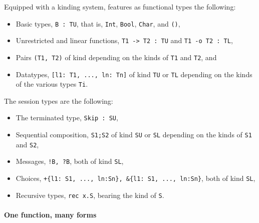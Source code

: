 Equipped with a kinding system, \freest{} features as functional types
the following:
%
\begin{itemize}
\item Basic types, \lstinline|B : TU|, that is, \lstinline|Int|,
  \lstinline|Bool|, \lstinline|Char|, and \lstinline|()|,
\item Unrestricted and linear functions, \lstinline|T1 -> T2 : TU| and
  \lstinline|T1 -o T2 : TL|,
\item Pairs \lstinline|(T1, T2)| of kind
  depending on the kinds of
  \lstinline|T1| and \lstinline|T2|, and
\item Datatypes, \lstinline|[l1: T1, ..., ln: Tn]| of kind
  \lstinline|TU| or \lstinline|TL| depending on the kinds of the
  various types \lstinline|Ti|.
\end{itemize}

The session types are the following:
\begin{itemize}
\item The terminated type, \lstinline|Skip : SU|,
\item Sequential composition, \lstinline|S1;S2| of kind \lstinline|SU|
  or \lstinline|SL| depending on the kinds of \lstinline|S1| and
  \lstinline|S2|,
\item  Messages, \lstinline|!B, ?B|, both of kind \lstinline|SL|,
\item Choices, \lstinline|+{l1: S1, ..., ln:Sn}, &{l1: S1, ..., ln:Sn}|,
  both of kind \lstinline|SL|,
\item Recursive types, \lstinline|rec x.S|, bearing the kind of
  \lstinline|S|.
\end{itemize}

\paragraph{One function, many forms}

